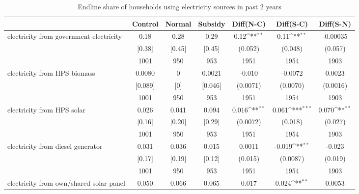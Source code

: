 \begin{table}[htbp]\centering
\def\sym#1{\ifmmode^{#1}\else\(^{#1}\)\fi}
\caption{Endline share of households using electricity sources in past 2 years \label{tab:"balance"}}
\begin{tabular*}{1\hsize}{@{\hskip\tabcolsep\extracolsep\fill}l*{1}{cccccc}}
\toprule
                                &  Control&   Normal&  Subsidy&Diff(N-C)         &Diff(S-C)         &Diff(S-N)         \\
\midrule
electricity from government electricity&     0.18&     0.28&     0.29&     0.12\sym{**} &     0.11\sym{**} & -0.00035         \\
                                &   [0.38]&   [0.45]&   [0.45]&  (0.052)         &  (0.048)         &  (0.057)         \\
                                &     1001&      950&      953&     1951         &     1954         &     1903         \\
electricity from HPS biomass    &   0.0080&        0&   0.0021&   -0.010         &  -0.0072         &   0.0023         \\
                                &  [0.089]&      [0]&  [0.046]& (0.0071)         & (0.0070)         & (0.0016)         \\
                                &     1001&      950&      953&     1951         &     1954         &     1903         \\
electricity from HPS solar      &    0.026&    0.041&    0.094&    0.016\sym{**} &    0.061\sym{***}&    0.070\sym{**} \\
                                &   [0.16]&   [0.20]&   [0.29]& (0.0072)         &  (0.018)         &  (0.027)         \\
                                &     1001&      950&      953&     1951         &     1954         &     1903         \\
electricity from diesel generator&    0.031&    0.036&    0.015&   0.0011         &   -0.019\sym{**} &   -0.023         \\
                                &   [0.17]&   [0.19]&   [0.12]&  (0.015)         & (0.0087)         &  (0.019)         \\
                                &     1001&      950&      953&     1951         &     1954         &     1903         \\
electricity from own/shared solar panel&    0.050&    0.066&    0.065&    0.017         &    0.024\sym{**} &   0.0053         \\

\end{tabular*}
\end{table}
